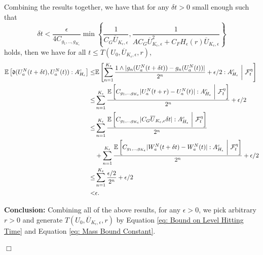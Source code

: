 \documentclass[12pt]{article}
\newenvironment {proof}{{\noindent\bf Proof }}{\hfill $\Box$ \medskip}
\begin{document}
\begin{proof}
Combining the results together, we have that for any $\delta t > 0$ small enough such that 
\begin{equation}
\delta t < \frac{\epsilon  }{4C_{g_1,..,g_{K_{\epsilon}}}}\min\left\{\frac{1}{C_G \overline{U}_{K_{\epsilon}, \epsilon}}, \frac{1}{A C_G \overline{U}_{K_{\epsilon}, \epsilon}^2
        +
        C_F H_{\epsilon}(r) \overline{U}_{K_{\epsilon}, \epsilon}}\right\}    
\end{equation}
holds, then we have for all $t \leq T(U_0,\overline{U}_{K_{\epsilon},\epsilon},r)$,
\begin{equation}
\begin{aligned}
\mathbb{E}\left[\mathfrak{d}(U^{N}_{a}(t+\delta t),U^{N}_{a}(t)) : A_{H_{\epsilon}}^{c} \right] \leq  &  
  \mathbb{E}\left[\sum_{n=1}^{K_{\epsilon}}\frac{1 \wedge |g_n(U^{N}_{a}(t+\delta t))-g_n(U^{N}_{a}(t))|}{2^n} +  \epsilon/2: A_{H_{\epsilon}}^{c} ~\bigg|~{\cal F}_t^{
\eta}\right]  \\
 \leq &   \sum_{n=1}^{K_{\epsilon}}\frac{\mathbb{E}\left[C_{g_1,..,g_{K_{\epsilon}}} |U^{N}_{a}(t+r)-U^{N}_{a}(t)|: A_{H_{\epsilon}}^{c} ~\bigg|~{\cal F}_t^{
\eta} \right] }{2^n} +  \epsilon/2  \\
\leq&   \sum_{n=1}^{K_{\epsilon}}\frac{\mathbb{E}\left[C_{g_1,..,g_{K_{\epsilon}}} |C_G \overline{U}_{K_{\epsilon}, \epsilon} \delta t|  : A_{H_{\epsilon}}^{c} ~\bigg|~{\cal F}_t^{
\eta} \right] }{2^n}  \\
 & + \sum_{n=1}^{K_{\epsilon}}\frac{\mathbb{E}\left[C_{g_1,..,g_{K_{\epsilon}}}  |W^N_a(t+\delta t)-W^N_a(t)|: A_{H_{\epsilon}}^{c} ~\bigg|~{\cal F}_t^{
\eta} \right] }{2^n} +  \epsilon/2  \\
\leq  &  \sum_{n=1}^{K_{\epsilon}}\frac{\epsilon /2 }{2^n} +  \epsilon/2 \\
< &  \epsilon.
\end{aligned}
\end{equation}


\textbf{Conclusion:} Combining all of the above results, for any $\epsilon > 0$, we pick arbitrary $r>0$ and
generate $T(U_0,\overline{U}_{K_{\epsilon},\epsilon},r)$ by 
Equation \eqref{eq: Bound on Level Hitting Time} and Equation \eqref{eq: Mass Bound Constant}.


\end{proof}
\end{document}
